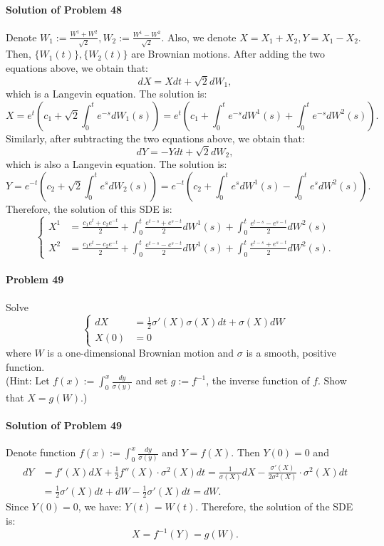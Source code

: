 \documentclass{article}
\begin{document}
\paragraph{Solution of Problem 48} Denote $W_1 := \frac{W^1+W^2}{\sqrt{2}}, W_2 := \frac{W^1-W^2}{\sqrt{2}}$. Also, we denote $X=X_1+X_2, Y=X_1-X_2$. Then, $\{W_1(t)\}, \{W_2(t)\}$ are Brownian motions. After adding the two equations above, we obtain that:
\[dX = Xdt + \sqrt{2}dW_1,\]
which is a Langevin equation. The solution is:
\[X = e^t\left(c_1 + \sqrt{2}\int_0^t e^{-s}dW_1(s)\right)= e^t\left(c_1 + \int_0^t e^{-s}dW^1(s)+\int_0^t e^{-s}dW^2(s)\right).\]
Similarly, after subtracting the two equations above, we obtain that:
\[dY = -Ydt + \sqrt{2}dW_2,\]
which is also a Langevin equation. The solution is:
\[Y = e^{-t}\left(c_2 + \sqrt{2}\int_0^t e^{s}dW_2(s)\right)= e^{-t}\left(c_2 + \int_0^t e^{s}dW^1(s)-\int_0^t e^{s}dW^2(s)\right). \]
Therefore, the solution of this SDE is:
\[\begin{cases}
X^1 &= \frac{c_1 e^t + c_2 e^{-t}}{2} + \int_0^t \frac{e^{t-s}+e^{s-t}}{2}dW^1(s) + \int_0^t \frac{e^{t-s}-e^{s-t}}{2}dW^2(s)\\
X^2 &= \frac{c_1 e^t - c_2 e^{-t}}{2} + \int_0^t \frac{e^{t-s}-e^{s-t}}{2}dW^1(s) + \int_0^t \frac{e^{t-s}+e^{s-t}}{2}dW^2(s).
\end{cases}\]

\paragraph{Problem 49} Solve
\[\begin{cases}
dX &= \frac12 \sigma'(X)\sigma(X)dt + \sigma(X) dW\\
X(0) &= 0
\end{cases}\]
where $W$ is a one-dimensional Brownian motion and $\sigma$ is a smooth, positive function.\\
(Hint: Let $f(x):=\int_0^x \frac{dy}{\sigma(y)}$ and set $g:=f^{-1}$, the inverse function of $f$. Show that $X=g(W)$.)


\paragraph{Solution of Problem 49} Denote function $f(x):=\int_0^x \frac{dy}{\sigma(y)}$ and $Y = f(X)$. Then $Y(0)=0$ and 
\begin{equation*}
\begin{aligned}
dY &= f'(X) dX + \frac12 f''(X)\cdot\sigma^2(X) dt = \frac{1}{\sigma(X)}dX -\frac{\sigma'(X)}{2\sigma^2(X)}\cdot  \sigma^2(X) dt\\
&= \frac12 \sigma'(X)dt + dW - \frac12 \sigma'(X)dt = dW.
\end{aligned}    
\end{equation*}
Since $Y(0)=0$, we have: $Y(t)=W(t)$. Therefore, the solution of the SDE is:
\[X = f^{-1}(Y)=g(W).\]
\end{document}

